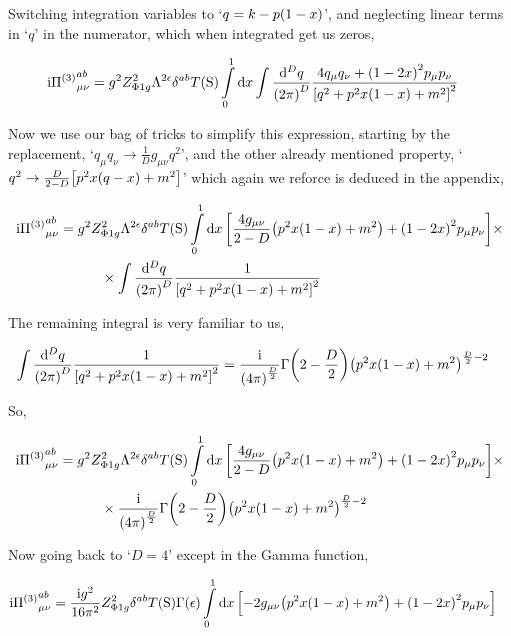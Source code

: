 Switching integration variables to `$q=k-p\qty(1-x)$', and neglecting linear terms in `$q$' in the numerator, which when 
integrated get us zeros,

\begin{align}
    \textnormal{i} {\Pi^{\qty(3)}}^{ab}_{\mu\nu}&=g^2Z^2_{\Phi1g}\Lambda^{2\epsilon}\delta^{ab}T\qty(\textnormal{S})
    \int\limits_0^1\dd{x}\int\frac{\dd[D]{q}}{\qty(2\pi)^D}
    \frac{4q_\mu q_\nu+\qty(1-2x)^2p_\mu p_\nu}{\qty[q^2+p^2x\qty(1-x)+m^2]^2}\nonumber
\end{align}

Now we use our bag of tricks to simplify this expression, starting by the replacement, 
`$q_\mu q_\nu\rightarrow \frac1Dg_{\mu\nu}q^2$', and the other already mentioned property, 
`$q^2\rightarrow \frac{D}{2-D}\qty[p^2x\qty(q-x)+m^2]$' which again we reforce is deduced in the appendix,

\begin{align}
    \textnormal{i} {\Pi^{\qty(3)}}^{ab}_{\mu\nu}&=g^2Z^2_{\Phi1g}\Lambda^{2\epsilon}\delta^{ab}T\qty(\textnormal{S})
    \int\limits_0^1\dd{x}\qty[\frac{4g_{\mu\nu}}{2-D}\qty(p^2x\qty(1-x)+m^2)+\qty(1-2x)^2p_\mu p_\nu]\times\nonumber\\
    &\quad\quad\quad\times\int\frac{\dd[D]{q}}{\qty(2\pi)^D}
    \frac{1}{\qty[q^2+p^2x\qty(1-x)+m^2]^2}\nonumber
\end{align}

The remaining integral is very familiar to us,

\begin{align}
    \int\frac{\dd[D]{q}}{\qty(2\pi)^D}
    \frac{1}{\qty[q^2+p^2x\qty(1-x)+m^2]^2}&=\frac{\textnormal{i}}{\qty(4\pi)^{\frac D2}}
    \Gamma\qty(2-\frac D2)\qty(p^2x\qty(1-x)+m^2)^{\frac D2-2}\nonumber
\end{align}

So,

\begin{align}
    \textnormal{i} {\Pi^{\qty(3)}}^{ab}_{\mu\nu}&=g^2Z^2_{\Phi1g}\Lambda^{2\epsilon}\delta^{ab}T\qty(\textnormal{S})
    \int\limits_0^1\dd{x}\qty[\frac{4g_{\mu\nu}}{2-D}\qty(p^2x\qty(1-x)+m^2)+\qty(1-2x)^2p_\mu p_\nu]\times\nonumber\\
    &\quad\quad\quad\times\frac{\textnormal{i}}{\qty(4\pi)^{\frac D2}}
    \Gamma\qty(2-\frac D2)\qty(p^2x\qty(1-x)+m^2)^{\frac D2-2}\nonumber
\end{align}

Now going back to `$D=4$' except in the Gamma function,

\begin{align}
    \textnormal{i} {\Pi^{\qty(3)}}^{ab}_{\mu\nu}&=\frac{\textnormal{i} g^2}{16\pi^2}Z^2_{\Phi1g}\delta^{ab}T\qty(\textnormal{S})
    \Gamma\qty(\epsilon)\int\limits_0^1\dd{x}\qty[-2g_{\mu\nu}\qty(p^2x\qty(1-x)+m^2)+\qty(1-2x)^2p_\mu p_\nu]\nonumber
\end{align}

